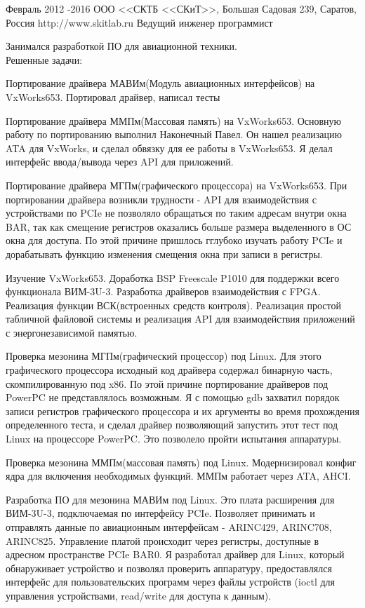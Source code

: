 \job
{Февраль 2012 -}{2016}
{ООО <<СКТБ <<СКиТ>>, Большая Садовая 239, Саратов, Россия}
{http://www.skitlab.ru}
{Ведущий инженер программист}
{Занимался разработкой ПО для авиационной техники.\\

Решенные задачи:
\begin{itemize-noindent}
\item{Портирование драйвера МАВИм(Модуль авиационных интерфейсов) на VxWorks653. Портировал драйвер, написал тесты}
\item{Портирование драйвера ММПм(Массовая память) на VxWorks653. Основную работу по портированию выполнил Наконечный Павел. Он нашел реализацию ATA для VxWorks, и сделал обвязку для ее работы в VxWorks653. Я делал интерфейс ввода/вывода через API для приложений.}
\item{Портирование драйвера МГПм(графического процессора) на VxWorks653. При портировании драйвера возникли трудности - API для взаимодействия с устройствами по PCIe не позволяло обращаться по таким адресам внутри окна BAR, так как смещение регистров оказались больше размера выделенного в ОС окна для доступа. По этой причине пришлось гглубоко изучать работу PCIe и дорабатывать функцию изменения смещения окна при записи в регистры.}
\item{Изучение VxWorks653. Доработка BSP Freescale P1010 для поддержки всего функционала ВИМ-3U-3. Разработка драйверов взаимодействия с FPGA. Реализация функции ВСК(встроенных средств контроля). Реализация простой табличной файловой системы и реализация API для взаимодействия приложений с энергонезависимой памятью.}
\item{Проверка мезонина МГПм(графический процессор) под Linux. Для этого графического процессора исходный код драйвера содержал бинарную часть, скомпилированную под x86. По этой причине портирование драйверов под PowerPC не представлялось возможным. Я с помощью gdb захватил порядок записи регистров графического процессора и их аргументы во время прохождения определенного теста, и сделал драйвер позволяющий запустить этот тест под Linux на процессоре PowerPC. Это позволело пройти испытания аппаратуры.}
\item{Проверка мезонина ММПм(массовая память) под Linux. Модернизировал конфиг ядра для включения необходимых функций. ММПм работает через ATA, AHCI.}
\item{Разработка ПО для мезонина МАВИм под Linux. Это плата расширения для ВИМ-3U-3, подключаемая по интерфейсу PCIe. Позволяет принимать и отправлять данные по авиационным интерфейсам - ARINC429, ARINC708, ARINC825. Управление платой происходит через регистры, доступные в адресном пространстве PCIe BAR0. Я разработал драйвер для Linux, который обнаруживает устройство и позволял проверить аппаратуру, предоставлялся интерфейс для пользовательских программ через файлы устройств (ioctl для управления устройствами, read/write для доступа к данным).}

\end{itemize-noindent}}
